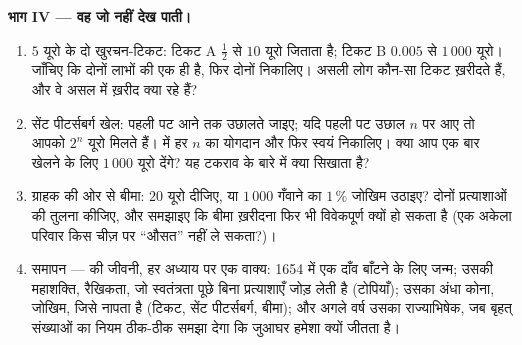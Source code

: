 \begin{problem}[{सप्ताहांत समस्या --- पास्कल, फ़र्मा और बीच में रुके दाँव का
न्यायसंगत बँटवारा: प्रत्याशा का जन्म, रैखिकता का जादू, और वह जो प्रत्याशा
नहीं देख पाती}]
\medskip
\noindent\textbf{भाग IV --- वह जो  नहीं देख पाती।}
\begin{enumerate}[resume]
  \item $5$ यूरो के दो खुरचन-टिकट: टिकट A  $\frac12$ से $10$ यूरो
        जिताता है; टिकट B  $0.005$ से $1\,000$ यूरो। जाँचिए कि दोनों
        लाभों की  एक ही है, फिर दोनों  निकालिए। असली लोग
        कौन-सा टिकट ख़रीदते हैं, और वे असल में ख़रीद क्या रहे हैं?
  \item सेंट पीटर्सबर्ग खेल: पहली पट आने तक उछालते जाइए; यदि पहली पट उछाल
        $n$ पर आए तो आपको $2^n$ यूरो मिलते हैं।  में हर $n$ का
        योगदान और फिर  स्वयं निकालिए। क्या आप एक बार खेलने के लिए
        $1\,000$ यूरो देंगे? यह टकराव  के बारे में क्या सिखाता है?
  \item ग्राहक की ओर से बीमा: $20$ यूरो दीजिए, या $1\,000$ गँवाने का $1\,\%$
        जोखिम उठाइए? दोनों प्रत्याशाओं की तुलना कीजिए, और समझाइए कि बीमा
        ख़रीदना फिर भी विवेकपूर्ण क्यों हो सकता है (एक अकेला परिवार किस
        चीज़ पर ``औसत'' नहीं ले सकता?)।
  \item समापन ---  की जीवनी, हर अध्याय पर एक वाक्य: 1654 में एक
        दाँव बाँटने के लिए जन्म; उसकी महाशक्ति, रैखिकता, जो स्वतंत्रता पूछे
        बिना प्रत्याशाएँ जोड़ लेती है (टोपियाँ); उसका अंधा कोना, जोखिम,
        जिसे  नापता है (टिकट, सेंट पीटर्सबर्ग, बीमा); और अगले वर्ष
        उसका राज्याभिषेक, जब बृहत् संख्याओं का नियम ठीक-ठीक समझा देगा कि
        जुआघर हमेशा क्यों जीतता है।
\end{enumerate}
\end{problem}
